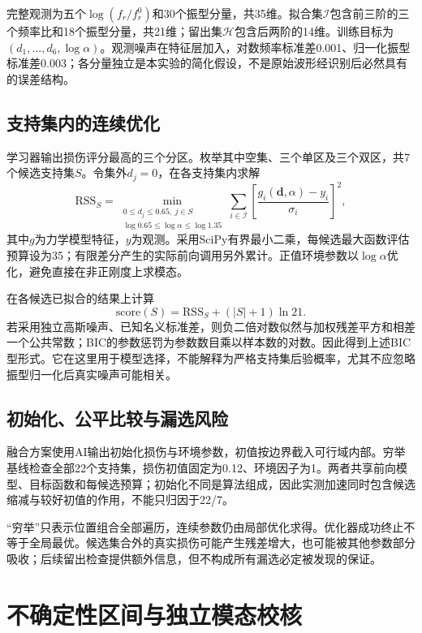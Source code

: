 \documentclass[UTF8,a4paper,11pt,fontset=fandol]{ctexart}
\begin{document}
完整观测为五个$\log(f_r/f_r^0)$和30个振型分量，共35维。拟合集$\mathcal I$包含前三阶的三个频率比和18个振型分量，共21维；留出集$\mathcal H$包含后两阶的14维。训练目标为$(d_1,\ldots,d_6,\log\alpha)$。观测噪声在特征层加入，对数频率标准差0.001、归一化振型标准差0.003；各分量独立是本实验的简化假设，不是原始波形经识别后必然具有的误差结构。
\subsection{支持集内的连续优化}
学习器输出损伤评分最高的三个分区。枚举其中空集、三个单区及三个双区，共7个候选支持集$S$。令集外$d_j=0$，在各支持集内求解
\begin{equation}
\mathrm{RSS}_S=\min_{\substack{0\le d_j\le0.65,\ j\in S\\\log0.65\le\log\alpha\le\log1.35}}
\sum_{i\in\mathcal I}\left[\frac{g_i(\boldsymbol d,\alpha)-y_i}{\sigma_i}\right]^2,
\end{equation}
其中$g$为力学模型特征，$y$为观测。采用SciPy有界最小二乘\cite{scipy}，每候选最大函数评估预算设为35；有限差分产生的实际前向调用另外累计。正值环境参数以$\log\alpha$优化，避免直接在非正刚度上求模态。

在各候选已拟合的结果上计算
\begin{equation}
\mathrm{score}(S)=\mathrm{RSS}_S+(|S|+1)\ln21.
\end{equation}
若采用独立高斯噪声、已知名义标准差，则负二倍对数似然与加权残差平方和相差一个公共常数；BIC的参数惩罚为参数数目乘以样本数的对数。因此得到上述BIC型形式。它在这里用于模型选择，不能解释为严格支持集后验概率，尤其不应忽略振型归一化后真实噪声可能相关。
\subsection{初始化、公平比较与漏选风险}
融合方案使用AI输出初始化损伤与环境参数，初值按边界截入可行域内部。穷举基线检查全部22个支持集，损伤初值固定为0.12、环境因子为1。两者共享前向模型、目标函数和每候选预算；初始化不同是算法组成，因此实测加速同时包含候选缩减与较好初值的作用，不能只归因于22/7。

“穷举”只表示位置组合全部遍历，连续参数仍由局部优化求得。优化器成功终止不等于全局最优。候选集合外的真实损伤可能产生残差增大，也可能被其他参数部分吸收；后续留出检查提供额外信息，但不构成所有漏选必定被发现的保证。

\newpage
\section{不确定性区间与独立模态校核}
\end{document}
